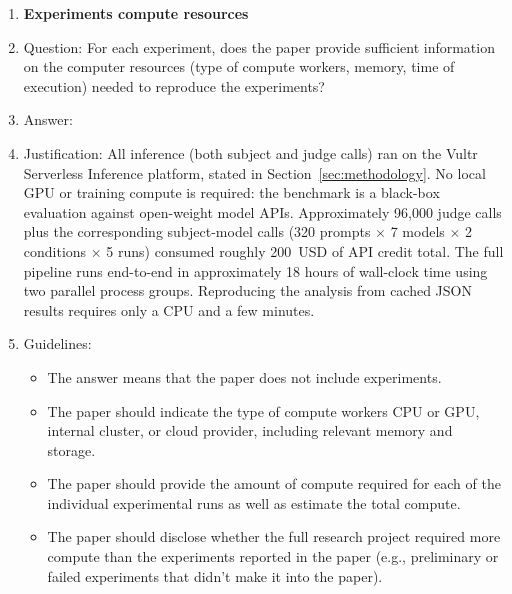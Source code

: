 \begin{enumerate}
\item {\bf Experiments compute resources}
    \item[] Question: For each experiment, does the paper provide sufficient information on the computer resources (type of compute workers, memory, time of execution) needed to reproduce the experiments?
    \item[] Answer: \answerYes{}
    \item[] Justification: All inference (both subject and judge calls) ran on the Vultr Serverless Inference platform, stated in Section~\ref{sec:methodology}. No local GPU or training compute is required: the benchmark is a black-box evaluation against open-weight model APIs. Approximately 96{,}000 judge calls plus the corresponding subject-model calls (320 prompts $\times$ 7 models $\times$ 2 conditions $\times$ 5 runs) consumed roughly 200~USD of API credit total. The full pipeline runs end-to-end in approximately 18 hours of wall-clock time using two parallel process groups. Reproducing the analysis from cached JSON results requires only a CPU and a few minutes.
    \item[] Guidelines:
    \begin{itemize}
        \item The answer \answerNA{} means that the paper does not include experiments.
        \item The paper should indicate the type of compute workers CPU or GPU, internal cluster, or cloud provider, including relevant memory and storage.
        \item The paper should provide the amount of compute required for each of the individual experimental runs as well as estimate the total compute.
        \item The paper should disclose whether the full research project required more compute than the experiments reported in the paper (e.g., preliminary or failed experiments that didn't make it into the paper).
    \end{itemize}


\end{enumerate}
